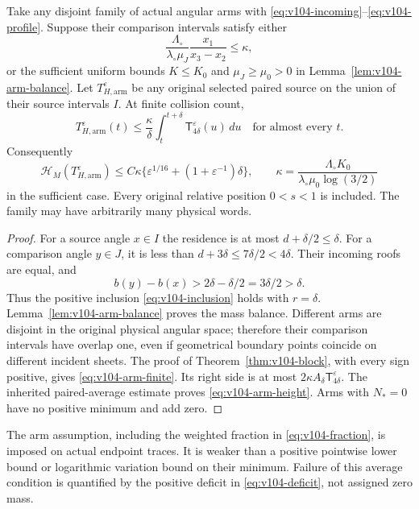 \begin{theorem}
\label{thm:v104-stationary}
Take any disjoint family of actual angular arms with
\eqref{eq:v104-incoming}--\eqref{eq:v104-profile}. Suppose their
comparison intervals satisfy either
\[
 \frac{\Lambda_\circ}{\lambda_\circ\mu_J}
                    \frac{x_1}{x_3-x_2}\le\kappa,
\]
or the sufficient uniform bounds $K\le K_0$ and $\mu_J\ge\mu_0>0$
in Lemma~\ref{lem:v104-arm-balance}. Let $T_{H,\mathrm{arm}}^
\varepsilon$ be any original selected paired source on the union
of their source intervals $I$. At finite collision count,
\begin{equation}\label{eq:v104-arm-finite}
 T_{H,\mathrm{arm}}^\varepsilon(t)
 \le\frac{\kappa}{\delta}\int_t^{t+\delta}
                        \mathsf T_{4\delta}^\varepsilon(u)\,du
 \quad\text{for almost every }t.
\end{equation}
Consequently
\begin{equation}\label{eq:v104-arm-height}
 \mathcal H_M(T_{H,\mathrm{arm}}^\varepsilon)
 \le C\kappa\{\varepsilon^{1/16}
                                    +(1+\varepsilon^{-1})\delta\},
 \qquad
 \kappa=\frac{\Lambda_\circ K_0}
              {\lambda_\circ\mu_0\log(3/2)}
\end{equation}
in the sufficient case. Every original relative position $0<s<1$
is included. The family may have arbitrarily many physical words.
\end{theorem}
\begin{proof}
For a source angle $x\in I$ the residence is at most
$d+\delta/2\le\delta$. For a comparison angle $y\in J$, it is
less than $d+3\delta\le7\delta/2<4\delta$. Their incoming roofs
are equal, and
\[
 b(y)-b(x)>2\delta-\delta/2=3\delta/2>\delta.
\]
Thus the positive inclusion \eqref{eq:v104-inclusion} holds with
$r=\delta$. Lemma~\ref{lem:v104-arm-balance} proves the mass balance.
Different arms are disjoint in the original physical angular space;
therefore their comparison intervals have overlap one, even if
geometrical boundary points coincide on different incident sheets.
The proof of Theorem~\ref{thm:v104-block}, with every sign positive,
gives \eqref{eq:v104-arm-finite}. Its right side is at most
$2\kappa A_\delta\mathsf T_{4\delta}^\varepsilon$. The inherited
paired-average estimate proves \eqref{eq:v104-arm-height}.
Arms with $N_*=0$ have no positive minimum and add zero.
\end{proof}

The arm assumption, including the weighted fraction in
\eqref{eq:v104-fraction}, is imposed on actual endpoint traces.
It is weaker than a positive pointwise lower bound or logarithmic
variation bound on their minimum. Failure of this average condition
is quantified by the positive deficit in \eqref{eq:v104-deficit},
not assigned zero mass.

